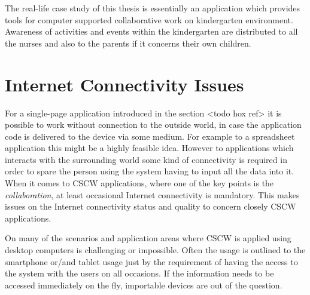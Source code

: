 The real-life case study of this thesis is essentially an application which provides tools for computer supported collaborative work on kindergarten environment. Awareness of activities and events within the kindergarten are distributed to all the nurses and also to the parents if it concerns their own children. 







\section{Internet Connectivity Issues}




For a single-page application introduced in the section <todo hox ref> it is possible to work without connection to the outside world, in case the application code is delivered to the device via some medium. For example to a spreadsheet application this might be a highly feasible idea. However to applications which interacts with the surrounding world some kind of connectivity is required in order to spare the person using the system having to input all the data into it. When it comes to CSCW applications, where one of the key points is the \textit{collaboration}, at least occasional Internet connectivity is mandatory. This makes issues on the Internet connectivity status and quality to concern closely CSCW applications. %

On many of the scenarios and application areas where CSCW is applied using desktop computers is challenging or impossible. Often the usage is outlined to the smartphone or/and tablet usage just by the requirement of having the access to the system with the users on all occasions. If the information needs to be accessed immediately on the fly, importable devices are out of the question.

